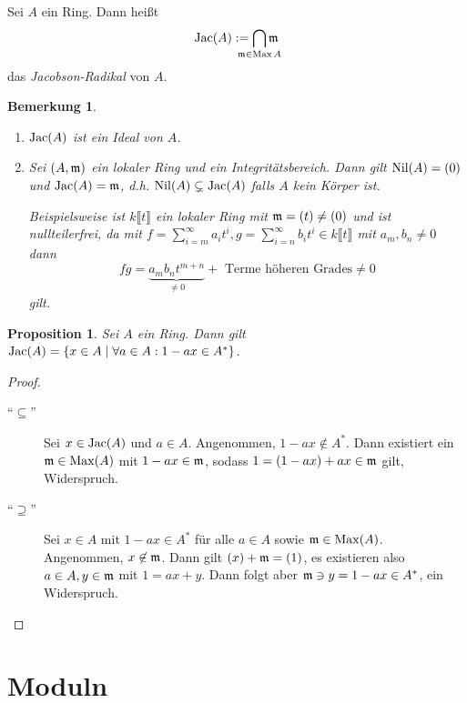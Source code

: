 \documentclass[12pt,a4paper]{scrartcl}
\theoremstyle{cplain}
\newtheorem{prop}[thmcounter]{Proposition}
\theoremstyle{cdef}
\newtheorem{beme}[thmcounter]{Bemerkung}
\begin{document}
\begin{defi}
    Sei $A$ ein Ring. Dann heißt \[\Jac(A) := \bigcap_{\mathclap{\fm\in \Max{A}}} \fm\] das \emph{Jacobson-Radikal} von $A$.
\end{defi}
\begin{beme}
    \leavevmode
    \begin{enumerate}
        \item $\operatorname{Jac}(A)$ ist ein Ideal von $A$.
        \item Sei $(A, \mathfrak{m})$ ein lokaler Ring und ein Integritätsbereich. Dann gilt $\operatorname{Nil}(A)=(0)$ und $\operatorname{Jac}(A) = \mathfrak{m}$, d.h. $\operatorname{Nil}(A) \subsetneq \operatorname{Jac}(A)$ falls $A$ kein Körper ist.
        
        Beispielsweise ist $k\llbracket t\rrbracket$ ein lokaler Ring mit $\mathfrak{m}=(t)\neq (0)$ und ist nullteilerfrei, da mit $f=\sum_{i=m}^\infty a_it^i,g=\sum_{i=n}^\infty b_it^i \in k\llbracket t\rrbracket$ mit $a_m,b_n \neq 0$ dann \[ fg = \underbrace{a_mb_nt^{m+n}}_{\neq 0} + \text{ Terme höheren Grades} \neq 0 \] gilt.
    \end{enumerate}
\end{beme}
\begin{prop} \label{prop:jacobson}
    Sei $A$ ein Ring. Dann gilt $\operatorname{Jac}(A) = \{x\in A \mid \forall a\in A: 1-ax\in A^* \}$.
\end{prop}
\begin{proof}
    \leavevmode
    \begin{description}
        \item[\enquote{$\subseteq$}] Sei $x\in \operatorname{Jac}(A)$ und $a\in A$. Angenommen, $1-ax\not \in A^*$. Dann existiert ein $\mathfrak{m}\in \operatorname{Max}(A)$ mit $1-ax\in \mathfrak{m}$, sodass $1=(1-ax)+ax\in \mathfrak{m}$ gilt, Widerspruch.
        \item[\enquote{$\supseteq$}] Sei $x \in A$ mit $1-ax\in A^*$ für alle $a \in A$ sowie $\mathfrak{m}\in \operatorname{Max}(A)$. Angenommen, $x\not \in \mathfrak{m}$. Dann gilt $(x)+\mathfrak{m}=(1)$, es existieren also $a\in A, y\in \mathfrak{m}$ mit $1=ax+y$. Dann folgt aber $\mathfrak{m} \ni y = 1-ax \in A^*$, ein Widerspruch.
        \qedhere
    \end{description}
\end{proof}

\section{Moduln}
\end{document}

